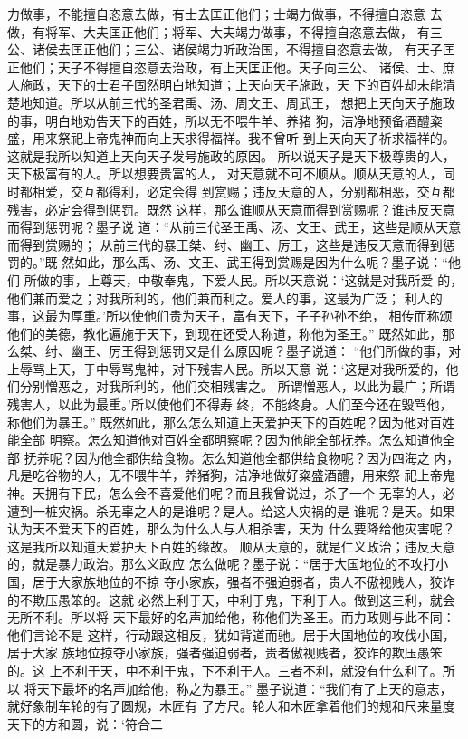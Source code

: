\documentclass[12pt,UTF8]{ctexbook}
\begin{document}
力做事，不能擅自恣意去做，有士去匡正他们；士竭力做事，不得擅自恣意 
去做，有将军、大夫匡正他们；将军、大夫竭力做事，不得擅自恣意去做， 
有三公、诸侯去匡正他们；三公、诸侯竭力听政治国，不得擅自恣意去做， 
有天子匡正他们；天子不得擅自恣意去治政，有上天匡正他。天子向三公、 
诸侯、士、庶人施政，天下的士君子固然明白地知道；上天向天子施政，天 
下的百姓却未能清楚地知道。所以从前三代的圣君禹、汤、周文王、周武王， 
想把上天向天子施政的事，明白地劝告天下的百姓，所以无不喂牛羊、养猪 
狗，洁净地预备酒醴粢盛，用来祭祀上帝鬼神而向上天求得福祥。我不曾听 
到上天向天子祈求福祥的。这就是我所以知道上天向天子发号施政的原因。 
所以说天子是天下极尊贵的人，天下极富有的人。所以想要贵富的人， 
对天意就不可不顺从。顺从天意的人，同时都相爱，交互都得利，必定会得 
到赏赐；违反天意的人，分别都相恶，交互都残害，必定会得到惩罚。既然 
这样，那么谁顺从天意而得到赏赐呢？谁违反天意而得到惩罚呢？墨子说 
道：“从前三代圣王禹、汤、文王、武王，这些是顺从天意而得到赏赐的； 
从前三代的暴王桀、纣、幽王、厉王，这些是违反天意而得到惩罚的。”既 
然如此，那么禹、汤、文王、武王得到赏赐是因为什么呢？墨子说：“他们 
所做的事，上尊天，中敬奉鬼，下爱人民。所以天意说：‘这就是对我所爱 
的，他们兼而爱之；对我所利的，他们兼而利之。爱人的事，这最为广泛； 
利人的事，这最为厚重。’所以使他们贵为天子，富有天下，子子孙孙不绝， 
相传而称颂他们的美德，教化遍施于天下，到现在还受人称道，称他为圣王。” 
既然如此，那么桀、纣、幽王、厉王得到惩罚又是什么原因呢？墨子说道： 
“他们所做的事，对上辱骂上天，于中辱骂鬼神，对下残害人民。所以天意 
说：‘这是对我所爱的，他们分别憎恶之，对我所利的，他们交相残害之。 
所谓憎恶人，以此为最广；所谓残害人，以此为最重。’所以使他们不得寿 
终，不能终身。人们至今还在毁骂他，称他们为暴王。” 
既然如此，那么怎么知道上天爱护天下的百姓呢？因为他对百姓能全部 
明察。怎么知道他对百姓全都明察呢？因为他能全部抚养。怎么知道他全部 
抚养呢？因为他全都供给食物。怎么知道他全都供给食物呢？因为四海之 
内，凡是吃谷物的人，无不喂牛羊，养猪狗，洁净地做好粢盛酒醴，用来祭 
祀上帝鬼神。天拥有下民，怎么会不喜爱他们呢？而且我曾说过，杀了一个 
无辜的人，必遭到一桩灾祸。杀无辜之人的是谁呢？是人。给这人灾祸的是 
谁呢？是天。如果认为天不爱天下的百姓，那么为什么人与人相杀害，天为 
什么要降给他灾害呢？这是我所以知道天爱护天下百姓的缘故。 
顺从天意的，就是仁义政治；违反天意的，就是暴力政治。那么义政应 
怎么做呢？墨子说：“居于大国地位的不攻打小国，居于大家族地位的不掠 
夺小家族，强者不强迫弱者，贵人不傲视贱人，狡诈的不欺压愚笨的。这就 
必然上利于天，中利于鬼，下利于人。做到这三利，就会无所不利。所以将 
天下最好的名声加给他，称他们为圣王。而力政则与此不同：他们言论不是 
这样，行动跟这相反，犹如背道而驰。居于大国地位的攻伐小国，居于大家 
族地位掠夺小家族，强者强迫弱者，贵者傲视贱者，狡诈的欺压愚笨的。这 
上不利于天，中不利于鬼，下不利于人。三者不利，就没有什么利了。所以 
将天下最坏的名声加给他，称之为暴王。” 
墨子说道：“我们有了上天的意志，就好象制车轮的有了圆规，木匠有 
了方尺。轮人和木匠拿着他们的规和尺来量度天下的方和圆，说：‘符合二 
\end{document}
